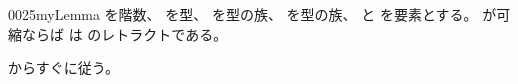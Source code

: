 \documentclass[index]{subfiles}
\begin{document}
\begin{myBlock}{0025}{myLemma}
  を階数、
  を型、
  を型の族、
  を型の族、
  と
  を要素とする。
  が可縮ならば
  は
  のレトラクトである。
\end{myBlock}
\begin{myProof}
  からすぐに従う。
\end{myProof}
\end{document}
